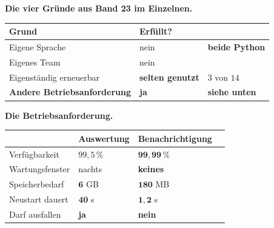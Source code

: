\begin{merksatz}
\textbf{Die vier Gründe aus Band 23 im Einzelnen.}

\begin{center}
{\small
\renewcommand{\arraystretch}{1.45}
\begin{tabular}{@{}P{3.2cm}P{2.2cm}P{2.4cm}@{}}
\toprule
\textbf{Grund} & \textbf{Erfüllt?} & \\
\midrule
Eigene Sprache & \textcolor{akzent}{nein} & \textbf{beide Python}\\
Eigenes Team & \textcolor{akzent}{nein} & \\
Eigenständig erneuerbar & \textcolor{akzent}{\textbf{selten genutzt}} & $3$ von $14$\\
\textbf{Andere Betriebsanforderung} & \textcolor{gruen}{\textbf{ja}} & \textcolor{gruen}{\textbf{siehe unten}}\\
\bottomrule
\end{tabular}}
\end{center}

\begin{center}
\begin{minipage}{0.88\textwidth}
\end{minipage}
\end{center}

\textbf{Die Betriebsanforderung.}

\begin{center}
\renewcommand{\arraystretch}{1.45}
\begin{tabular}{@{}P{2.6cm}P{2.2cm}P{2.4cm}P{1.6cm}@{}}
\toprule
& \textbf{Aus\-wertung} & \textbf{Benach\-richtigung} & \\
\midrule
Verfügbarkeit & $99{,}5\,\%$ & \textcolor{gruen}{$\mathbf{99{,}99\,\%}$} & \\
Wartungs\-fenster & \textcolor{gruen}{nachts} & \textcolor{akzent}{\textbf{keines}} & \\
Speicherbedarf & $\mathbf{6}$ GB & $\mathbf{180}$ MB & \\
Neustart dauert & $\mathbf{40}$ s & $\mathbf{1{,}2}$ s & \\
Darf ausfallen & \textcolor{gruen}{\textbf{ja}} & \textcolor{akzent}{\textbf{nein}} & \\
\bottomrule
\end{tabular}
\end{center}

\begin{center}
\end{center}
\end{merksatz}

